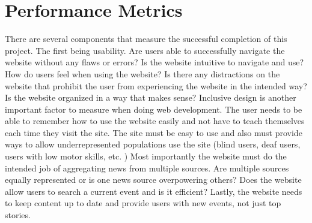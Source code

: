 \documentclass[onecolumn, draftclsnofoot,10pt, compsoc]{IEEEtran}
\begin{document}
\section{Performance Metrics}
There are several components that measure the successful completion of this project.
 The first being usability.
 Are users able to successfully navigate the website without any flaws or errors? Is the website intuitive to navigate and use? How do users feel when using the website? Is there any distractions on the website that prohibit the user from experiencing the website in the intended way? Is the website organized in a way that makes sense? Inclusive design is another important factor to measure when doing web development.
 The user needs to be able to remember how to use the website easily and not have to teach themselves each time they visit the site.
 The site must be easy to use and also must provide ways to allow underrepresented populations use the site (blind users, deaf users, users with low motor skills, etc.
) Most importantly the website must do the intended job of aggregating news from multiple sources.
 Are multiple sources equally represented or is one news source overpowering others? Does the website allow users to search a current event and is it efficient? Lastly, the website needs to keep content up to date and provide users with new events, not just top stories.
 
\end{document}
